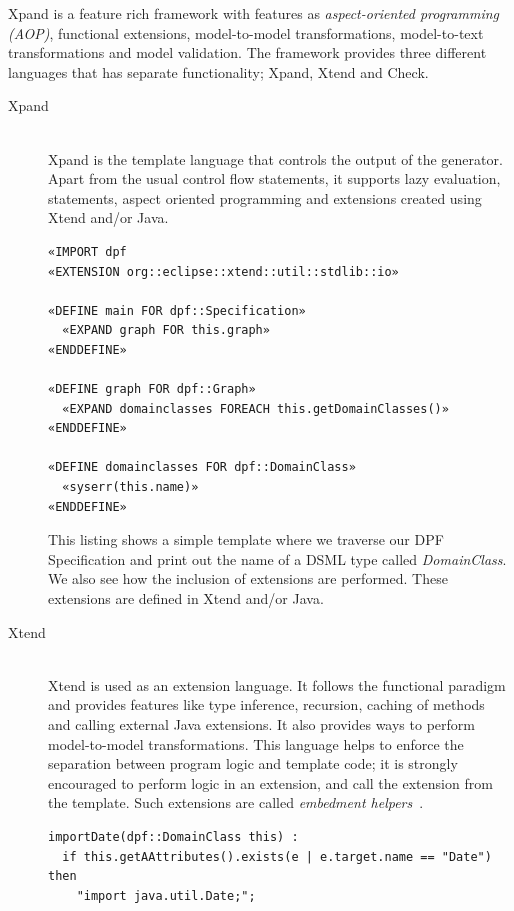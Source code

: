 Xpand is a feature rich framework with features as \emph{aspect-oriented programming (AOP)}, functional extensions, model-to-model transformations, model-to-text transformations and model validation. The framework provides three different languages that has separate functionality; Xpand, Xtend and Check.
\begin{description}
  \item[Xpand] \hfill \\
    Xpand is the template language that controls the output of the generator. Apart from the usual control flow statements, it supports lazy evaluation,  statements, aspect oriented programming and extensions created using Xtend and/or Java.
\newpage
\lstset{caption=Example showing the Xpand syntax,label=list:xpandexample,captionpos=b}
  \begin{lstlisting}[showstringspaces=false]
«IMPORT dpf
«EXTENSION org::eclipse::xtend::util::stdlib::io»
 
«DEFINE main FOR dpf::Specification»
  «EXPAND graph FOR this.graph»
«ENDDEFINE»
 
«DEFINE graph FOR dpf::Graph»
  «EXPAND domainclasses FOREACH this.getDomainClasses()»
«ENDDEFINE»
 
«DEFINE domainclasses FOR dpf::DomainClass»
  «syserr(this.name)»
«ENDDEFINE»
  \end{lstlisting}
    This listing shows a simple template where we traverse our DPF Specification and print out the name of a DSML type called \emph{DomainClass}. We also see how the inclusion of extensions are performed. These extensions are defined in Xtend and/or Java.
  
  \item[Xtend] \hfill \\
    Xtend is used as an extension language. It follows the functional paradigm and provides features like type inference, recursion, caching of methods and calling external Java extensions. It also provides ways to perform model-to-model transformations. This language helps to enforce the separation between program logic and template code; it is strongly encouraged to perform logic in an extension, and call the extension from the template. Such extensions are called \emph{embedment helpers}~\cite{fowler2010domain}.
\lstset{caption=Example showing Xtend extensions,label=list:xtendexample,captionpos=b}
  \begin{lstlisting}[showstringspaces=false]
importDate(dpf::DomainClass this) :
  if this.getAAttributes().exists(e | e.target.name == "Date") then
	"import java.util.Date;";


\end{lstlisting}
\end{description}
